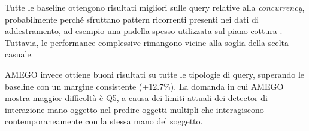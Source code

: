 \begin{table}[ht]
    \centering
    \caption{Accuracy (\%) sulle diverse query di AMB. Migliori valori in grassetto.}
\end{table}

Tutte le baseline ottengono risultati migliori sulle query relative alla \emph{concurrency}, probabilmente perché sfruttano pattern ricorrenti presenti nei dati di addestramento, ad esempio una padella spesso utilizzata sul piano cottura \cite{goletto2024amego}. Tuttavia, le performance complessive rimangono vicine alla soglia della scelta casuale.

AMEGO invece ottiene buoni risultati su tutte le tipologie di query, superando le baseline con un margine consistente (+12.7\%). La domanda in cui AMEGO mostra maggior difficoltà è Q5, a causa dei limiti attuali dei detector di interazione mano-oggetto nel predire oggetti multipli che interagiscono contemporaneamente con la stessa mano del soggetto.